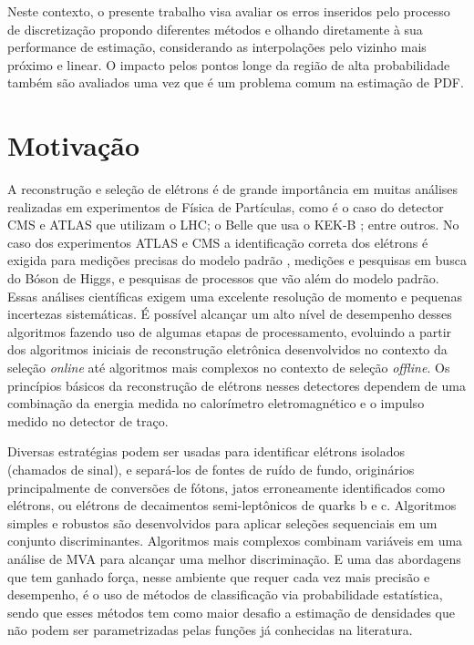 
Neste contexto, o presente trabalho visa avaliar os erros inseridos pelo processo de discretização propondo diferentes métodos e olhando diretamente à sua performance de estimação, considerando as interpolações pelo vizinho mais próximo e linear. O impacto pelos pontos longe da região de alta probabilidade também são avaliados uma vez que é um problema comum na estimação de \ac{PDF}.

\section{Motivação}


A reconstrução e seleção de elétrons é de grande importância em muitas análises realizadas em experimentos de Física de Partículas, como é o caso do detector CMS e ATLAS que utilizam o \ac{LHC}; o Belle \cite{hanagaki2002electron} que usa o KEK-B \cite{superk}; entre outros. No caso dos experimentos ATLAS e CMS a identificação correta dos elétrons é exigida para medições precisas do modelo padrão \cite{modelopadrao}, medições e pesquisas em busca do Bóson de Higgs, e pesquisas de processos que vão além do modelo padrão. Essas análises científicas exigem uma excelente resolução de momento e pequenas incertezas sistemáticas. É possível alcançar um alto nível de desempenho desses algoritmos fazendo uso de algumas etapas de processamento, evoluindo a partir dos algoritmos iniciais de reconstrução eletrônica desenvolvidos no contexto da seleção \textit{online} até algoritmos mais complexos no contexto de seleção \textit{offline}. Os princípios básicos da reconstrução de elétrons nesses detectores dependem de uma combinação da energia medida no calorímetro eletromagnético e o impulso medido no detector de traço.

Diversas estratégias podem ser usadas para identificar elétrons isolados (chamados de sinal), e separá-los de fontes de ruído de fundo, originários principalmente de conversões de fótons, jatos erroneamente identificados como elétrons, ou elétrons de decaimentos semi-leptônicos de quarks b e c. Algoritmos simples e robustos são desenvolvidos para aplicar seleções sequenciais em um conjunto discriminantes. Algoritmos mais complexos combinam variáveis em uma análise de \ac{MVA} para alcançar uma melhor discriminação. E uma das abordagens que tem ganhado força, nesse ambiente que requer cada vez mais precisão e desempenho, é o uso de métodos de classificação via probabilidade estatística, sendo que esses métodos tem como maior desafio a estimação de densidades que não podem ser parametrizadas pelas funções já conhecidas na literatura.


